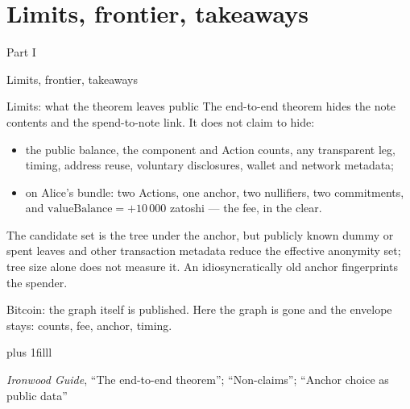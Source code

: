 \documentclass[aspectratio=169,11pt]{beamer}
\newcommand{\divider}[2]{%
  \section{#2}
  \begin{frame}[plain,t]
  \vspace*{14mm}
  {\small\color{arb}#1\par}
  \vskip8mm
  \begin{minipage}{0.88\textwidth}\raggedright
    \fontsize{27}{31}\selectfont #2\par
  \end{minipage}
  \end{frame}}
\newcommand{\src}[1]{\par\vskip0pt plus 1filll
  {\fontsize{6}{7.2}\selectfont\color{arbdim}\raggedright #1\par}}
\begin{document}
\divider{Part I}{Limits, frontier, takeaways}

\begin{frame}{Limits: what the theorem leaves public}
The end-to-end theorem hides the note contents and the spend-to-note
link. It does not claim to hide:
\begin{itemize}
  \item the public balance, the component and Action counts, any
    transparent leg, timing, address reuse, voluntary disclosures,
    wallet and network metadata;
  \item on Alice's bundle: two Actions, one anchor, two nullifiers, two
    commitments, and $\mathrm{valueBalance} = +10\,000$ zatoshi --- the
    fee, in the clear.
\end{itemize}
The candidate set is the tree under the anchor, but publicly known dummy
or spent leaves and other transaction metadata reduce the effective
anonymity set; tree size alone does not measure it. An idiosyncratically
old anchor fingerprints the spender.

\medskip
\alert{Bitcoin:} the graph itself is published. Here the graph is gone
and the envelope stays: counts, fee, anchor, timing.
\src{\emph{Ironwood Guide}, ``The end-to-end theorem'';
``Non-claims''; ``Anchor choice as public data''}
\end{frame}
\end{document}
